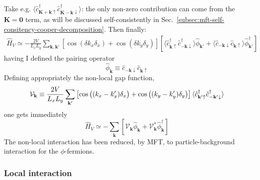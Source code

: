 Take e.g. $\langle \hat c_{\mathbf{K}+\mathbf{k} \uparrow}^\dagger \hat c_{\mathbf{K}-\mathbf{k} \downarrow}^\dagger \rangle$: the only non-zero contribution can come from the $\mathbf{K}=\mathbf{0}$ term, as will be discussed self-consistently in Sec.~\ref{subsec:mft-self-consitency-cooper-decomposition}. Then finally:
\[
\begin{aligned}
	\hat H_V \simeq - \frac{2V}{L_x L_y}\sum_{\mathbf{k}, \mathbf{k}'}
	\left[
		\cos \left(
			\delta k_x \delta_x
		\right)	+ \cos \left(
			\delta k_y \delta_y
		\right)	
	\right] \left[
		\langle 
			\hat c_{\mathbf{k}\uparrow}^\dagger \hat c_{-\mathbf{k} \downarrow}^\dagger
		\rangle \hat \phi_{\mathbf{k}'} + \langle 
			\hat c_{-\mathbf{k}\downarrow} \hat c_{\mathbf{k} \uparrow}
		\rangle \hat \phi_{\mathbf{k}'}^\dagger
	\right]	
\end{aligned}
\]
having I defined the pairing operator 
\[
	\hat \phi_\mathbf{k} \equiv \hat c_{-\mathbf{k}\downarrow} \hat c_{\mathbf{k} \uparrow}
\]
Defining appropriately the non-local gap function,
\begin{equation}\label{eq:gap-function-definition}
	\mathcal{V}_\mathbf{k} \equiv \frac{2V}{L_x L_y} \sum_{\mathbf{k}'} \left[
		\cos \left(
			\vphantom{A^A}
			(k_x-k_x') \delta_x
		\right)	+ \cos \left(
			\vphantom{A^A}
			(k_y-k_y') \delta_y
		\right)	
	\right] \langle 
		\hat c_{\mathbf{k}'\uparrow}^\dagger \hat c_{-\mathbf{k}' \downarrow}^\dagger
	\rangle
\end{equation}
one gets immediately
\begin{equation}\label{eq:extended-hubbard-nonlocal-interaction-mean-field-reciprocal}
	\hat H_V \simeq - \sum_\mathbf{k} \left[
		\mathcal{V}_\mathbf{k} \hat \phi_\mathbf{k} + \mathcal{V}_\mathbf{k}^* \hat \phi_\mathbf{k}^\dagger
	\right]	
\end{equation}
The non-local interaction has been reduced, by MFT, to particle-background interaction for the $\phi$-fermions.

\subsubsection*{Local interaction}

